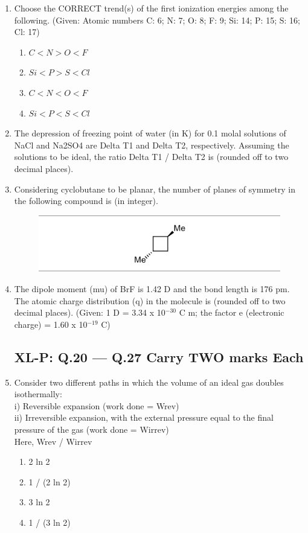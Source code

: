 \documentclass[journal,12pt,onecolumn]{IEEEtran}
\begin{document}
\begin{enumerate}
    \item Choose the CORRECT trend(s) of the first ionization energies among the following. (Given: Atomic numbers C: 6; N: 7; O: 8; F: 9; Si: 14; P: 15; S: 16; Cl: 17)
    \begin{enumerate}
        \item $C < N > O < F$
        \item $Si < P > S < Cl$
        \item $C < N < O < F$
        \item $Si < P < S < Cl$
    \end{enumerate}

    \item The depression of freezing point of water (in K) for 0.1 molal solutions of NaCl and Na2SO4 are Delta T1 and Delta T2, respectively. Assuming the solutions to be ideal, the ratio Delta T1 / Delta T2 is (rounded off to two decimal places).

    \item Considering cyclobutane to be planar, the number of planes of symmetry in the following compound is (in integer).\\
    \begin{figure}[H]
		\centering
            \includegraphics{18}
		    \caption*{}
		\label{fig:Q18}
	\end{figure}


    \item The dipole moment (mu) of BrF is 1.42 D and the bond length is 176 pm. The atomic charge distribution (q) in the molecule is (rounded off to two decimal places). (Given: 1 D = 3.34 x 10$^{-30}$ C m; the factor e (electronic charge) = 1.60 x 10$^{-19}$ C)

\subsection*{XL-P: Q.20 --- Q.27 Carry TWO marks Each}

    \item Consider two different paths in which the volume of an ideal gas doubles isothermally:\\
    i) Reversible expansion (work done = Wrev)\\
    ii) Irreversible expansion, with the external pressure equal to the final pressure of the gas (work done = Wirrev)\\
    Here, Wrev / Wirrev
    \begin{enumerate}
        \item 2 ln 2
        \item 1 / (2 ln 2)
        \item 3 ln 2
        \item 1 / (3 ln 2)
    \end{enumerate}


\end{enumerate}
\end{document}

